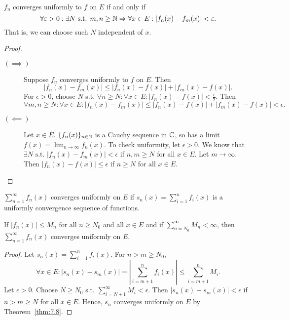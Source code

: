 \begin{thm}\\
	$f_n$ converges uniformly to $f$ on $E$ if and only if \[
		\forall{\varepsilon>0}: \exists{N} \text{ s.t. } m,n\ge \mathbb{N} \Rightarrow \forall{x \in E}: \left|f_{n}(x)-f_{m}(x)\right|<\varepsilon
		.\]
	That is, we can choose such $N$ independent of $x$.
	\begin{proof}
		\begin{description}
			\item[$(\implies)$]
			      Suppose $f_n$ converges uniformly to $f$ on $E$.
			      Then \[
				      \left|f_n(x)-f_m(x)\right|\le \left|f_n(x)-f(x)\right|+\left|f_m(x)-f(x)\right|
				      .\]
			      For $\epsilon>0$, choose $N$ s.t. $\forall{n\ge N}: \forall{x \in E}: \left|f_{n}(x)-f(x)\right|<\frac{\epsilon}{2}$.
			      Then \[
				      \forall{m,n\ge N}: \forall{x \in E}: \left|f_{n}(x)-f_{m}(x)\right|\le \left|f_{n}(x)-f(x)\right|+\left|f_{m}(x)-f(x)\right|<\epsilon
				      .\]
			\item[$(\impliedby)$]
			      Let $x \in E$. $\{f_{n}(x)\}_{n \in \mathbb{N}}$ is a Cauchy sequence in $\mathbb{C}$, so has a limit $f(x)= \lim_{n\to \infty}{f_{n}(x)}$.
			      To check uniformity, let $\epsilon>0$. We know that $\exists{N} \text{ s.t. } \left|f_{n}(x)-f_{m}(x)\right|<\epsilon$ if $n,m \ge N$ for all $x \in E$.
			      Let $m\to \infty$. Then $\left|f_{n}(x)-f(x)\right| \le \epsilon$ if $n\ge N$ for all $x \in E$.
		\end{description}
	\end{proof}
\end{thm}


\begin{define}
	$\sum_{n=1}^{\infty}{f_{n}(x)}$ converges uniformly on $E$ if $s_n(x)=\sum_{i=1}^{n}{f_{i}(x)}$	is a uniformly convergence sequence of functions.
\end{define}


\begin{thm}
	If $\left|f_{n}(x)\right| \le M_{n}$ for all $n \ge N_0$ and all $x \in E$ and if $\sum_{n=N_0}^{\infty}{M_n} < \infty$, then $\sum_{n=1}^{\infty}{f_{n}(x)}$ converges uniformly on $E$.
	\begin{proof}
		Let $s_{n}(x)=\sum_{i=1}^{n}{f_{i}(x)}$.
		For $n>m\ge N_0$, \[
			\forall{x \in E}:	\left|s_{n}(x)-s_{m}(x)\right| =\left|\sum_{i=m+1}^{n}{f_{i}(x)}\right| \le \sum_{i=m+1}^{n}{M_i}
			.\]
		Let $\epsilon>0$. Choose $N\ge N_0$ s.t. $\sum_{i=N+1}^{\infty}{M_i}<\epsilon$.
		Then $\left|s_{n}(x)-s_{m}(x)\right| <\epsilon$ if $n>m\ge N$ for all $x \in E$. Hence, $s_{n}$ converges uniformly on $E$ by Theorem~\ref{thm:7.8}.
	\end{proof}
\end{thm}

